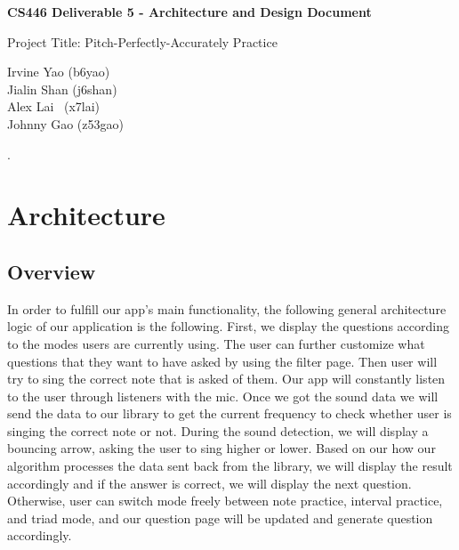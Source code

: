 \documentclass{article}
\begin{document}
\begin{titlepage}
   \vspace*{100px}
  \begin{center}

    \Large\textbf{CS446 Deliverable 5 - Architecture and Design Document}

   \vspace{50px}

    \Large{Project Title: Pitch-Perfectly-Accurately Practice}

   \vspace{50px}

    \large{Irvine Yao (b6yao)\\Jialin Shan (j6shan)\\Alex Lai \ (x7lai)\\Johnny Gao (z53gao)}

  \end{center}
\end{titlepage}
  
.


\section{Architecture}

\subsection{Overview}
In order to fulfill our app’s main functionality, the following general architecture logic of our application is the following. First, we display the questions according to the modes users are currently using. The user can further customize what questions that they want to have asked by using the filter page. Then user will try to sing the correct note that is asked of them. Our app will constantly listen to the user through listeners with the mic. Once we got the sound data we will send the data to our library to get the current frequency to check whether user is singing the correct note or not. During the sound detection, we will display a bouncing arrow, asking the user to sing higher or lower. Based on our how our algorithm processes the data sent back from the library, we will display the result accordingly and if the answer is correct, we will display the next question. Otherwise, user can switch mode freely between note practice, interval practice, and triad mode, and our question page will be updated and generate question accordingly. 
\end{document}
